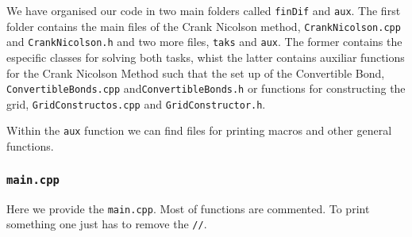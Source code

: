 We have organised our code in two main folders called \texttt{finDif} and \texttt{aux}. The first folder contains the main files of the Crank Nicolson method, \texttt{CrankNicolson.cpp} and \texttt{CrankNicolson.h} and two more files, \texttt{taks} and \texttt{aux}. The former contains the especific classes for solving both tasks, whist the latter contains auxiliar functions for the Crank Nicolson Method such that the set up of the Convertible Bond, \texttt{ConvertibleBonds.cpp} and\texttt{ConvertibleBonds.h} or functions for constructing the grid, \texttt{GridConstructos.cpp} and \texttt{GridConstructor.h}.

Within the \texttt{aux} function we can find files for printing macros and other general functions.

\subsubsection{\texttt{main.cpp}}
Here we provide the \texttt{main.cpp}. Most of functions are commented. To print something one just has to remove the \texttt{//}. 
